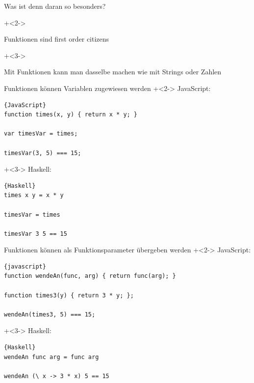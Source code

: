 \begin{frame}[fragile]{Was ist denn daran so besonders?}

\onslide+<2->
\begin{center}
\Large
Funktionen sind \glqq{}first order citizens\grqq{}
\end{center}

\vspace{2em}

\onslide+<3->
\begin{center}
Mit Funktionen kann man dasselbe machen wie mit Strings oder Zahlen
\end{center}

\end{frame}

\begin{frame}[fragile]{Funktionen können Variablen zugewiesen werden}
\onslide+<2->
JavaScript:
\begin{lstlisting}{JavaScript}
function times(x, y) { return x * y; }

var timesVar = times;
    
timesVar(3, 5) === 15;
\end{lstlisting}

\onslide+<3->
Haskell:
\begin{lstlisting}{Haskell}
times x y = x * y

timesVar = times

timesVar 3 5 == 15
\end{lstlisting}

\end{frame}

\begin{frame}[fragile]{Funktionen können als Funktionsparameter übergeben werden}
\onslide+<2->
JavaScript:
\begin{lstlisting}{javascript}
function wendeAn(func, arg) { return func(arg); }

function times3(y) { return 3 * y; };

wendeAn(times3, 5) === 15;
\end{lstlisting}

\onslide+<3->
Haskell:
\begin{lstlisting}{Haskell}
wendeAn func arg = func arg

wendeAn (\ x -> 3 * x) 5 == 15
\end{lstlisting}

\end{frame}

